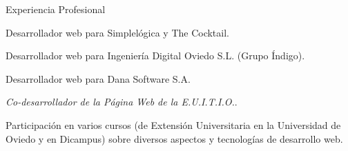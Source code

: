 
\begin{rubric}{Experiencia Profesional}


  \entry*[Desde el 02/2010]
  Desarrollador web para Simplelógica y The Cocktail.

  \entry*[Del 04/2008 al 02/2010]
  Desarrollador web para Ingeniería Digital Oviedo S.L. (Grupo Índigo).

  \entry*[Del 10/2006 al 06/2007]
  Desarrollador web para Dana Software S.A.

  \entry*[Del 02/2005 \\al 06/2006]
  \emph{Co-desarrollador de la Página Web de la E.U.I.T.I.O.}.


  \entry*[2008-2010]
  Participación en varios cursos (de Extensión Universitaria en la Universidad de Oviedo y en Dicampus) sobre diversos aspectos y tecnologías de desarrollo web.


\end{rubric}

